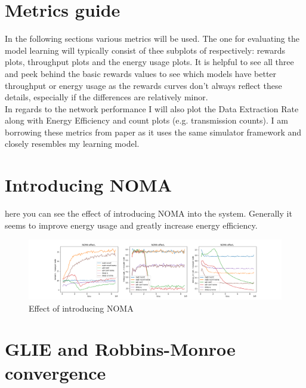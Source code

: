 
\section{Metrics guide}
In the following sections various metrics will be used.
The one for evaluating the model learning will 
typically consist of thee subplots of respectively:
rewards plots, throughput plots and the energy usage plots. It is helpful to see all three and peek behind
the basic rewards values to see which models have 
better throughput or energy usage as the rewards curves
don't always reflect these details, especially if the 
differences are relatively minor. \\

In regards to the network performance I will also 
plot the Data Extraction Rate along with Energy Efficiency and count plots (e.g. transmission counts).
I am borrowing these metrics from paper \cite{rl_lora_original} as it uses the same simulator 
framework and closely resembles my learning model.

\section{Introducing NOMA}

here you can see the effect of introducing NOMA
into the system. Generally it seems to improve
energy usage and greatly increase energy efficiency.

\begin{figure}[H]
\centering
\hspace*{-3.3cm}  
\includegraphics[scale=0.40]{plots/NOMA/noma_effect_small.png}
  \caption{Effect of introducing NOMA}
  \label{fig:tabular_q_decays}
\end{figure}

\section{GLIE and Robbins-Monroe convergence}

